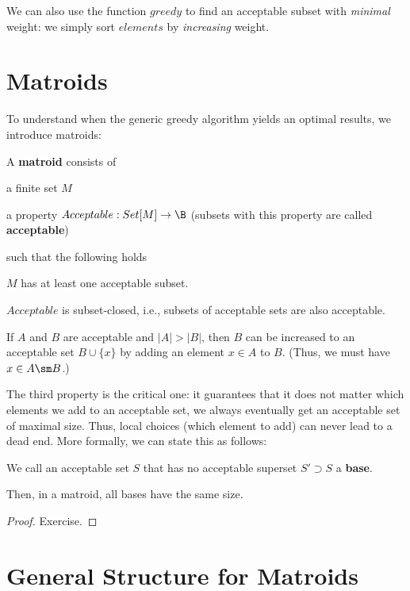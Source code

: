 We can also use the function $greedy$ to find an acceptable subset with \emph{minimal} weight: we simply sort $elements$ by \emph{increasing} weight.

\section{Matroids}

To understand when the generic greedy algorithm yields an optimal results, we introduce matroids:

\begin{definition}[Matroid]
A \textbf{matroid} consists of
\begin{compactitem}
\item a finite set $M$
\item a property $Acceptable:Set[M]\to\B$ (subsets with this property are called \textbf{acceptable}\footnotemark)
\end{compactitem}
such that the following holds
\begin{compactitem}
 \item $M$ has at least one acceptable subset.
 \item $Acceptable$ is subset-closed, i.e., subsets of acceptable sets are also acceptable.
 \item If $A$ and $B$ are acceptable and $|A|>|B|$, then $B$ can be increased to an acceptable set $B\cup\{x\}$ by adding an element $x\in A$ to $B$. (Thus, we must have $x\in A\sm B$.)
\end{compactitem}
\end{definition}

The third property is the critical one: it guarantees that it does not matter which elements we add to an acceptable set, we always eventually get an acceptable set of maximal size.
Thus, local choices (which element to add) can never lead to a dead end.
More formally, we can state this as follows:
\begin{theorem}
We call an acceptable set $S$ that has no acceptable superset $S'\supset S$ a \textbf{base}.

Then, in a matroid, all bases have the same size.
\end{theorem}
\begin{proof}
Exercise.
\end{proof}

\section{General Structure for Matroids}

